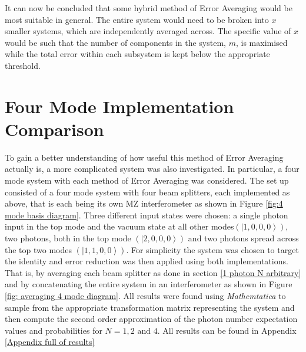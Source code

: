 \documentclass[aps,pra,twocolumn,superscriptaddress,numerical,floatfix]{revtex4-1}
\begin{document}
It can now be concluded that some hybrid method of Error Averaging would be most suitable in general. The entire system would need to be broken into $x$ smaller systems, which are independently averaged across. The specific value of $x$ would be such that the number of components in the system, $m$, is maximised while the total error within each subsystem is kept below the appropriate threshold.

\section{Four Mode Implementation Comparison \label{Four Mode Impementation Comparison}}

To gain a better understanding of how useful this method of Error Averaging actually is, a more complicated system was also investigated. In particular, a four mode system with each method of Error Averaging was considered. The set up consisted of a four mode system with four beam splitters, each implemented as above, that is each being its own MZ interferometer as shown in Figure \ref{fig:4 mode basis diagram}. Three different input states were chosen: a single photon input in the top mode and the vacuum state at all other modes$\left(\left|1,0,0,0\right\rangle \right)$, two photons, both in the top mode $\left(\left|2,0,0,0\right\rangle \right)$ and two photons spread across the top two modes $\left(\left|1,1,0,0\right\rangle \right)$. For simplicity the system was chosen to target the identity and error reduction was then applied using both implementations. That is, by averaging each beam splitter as done in section \ref{1 photon N arbitrary} and by concatenating the entire system in an interferometer as shown in Figure \ref{fig: averaging 4 mode diagram}. All results were found using \textit{Mathemtatica} to sample from the appropriate transformation matrix representing the system and then compute the second order approximation of the photon number expectation values and probabilities for $N=1, 2 \textrm{ and } 4$. All results can be found in Appendix \ref{Appendix full of results}
\end{document}
